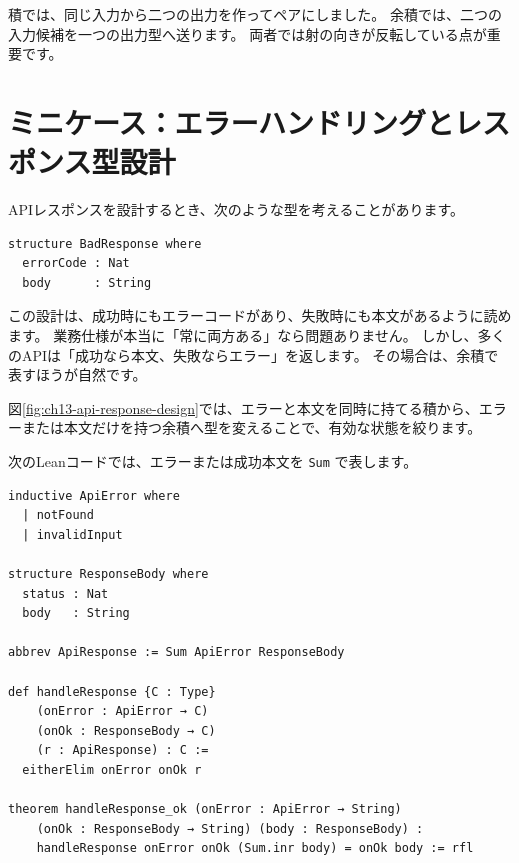 積では、同じ入力から二つの出力を作ってペアにしました。
余積では、二つの入力候補を一つの出力型へ送ります。
両者では射の向きが反転している点が重要です。

\section{ミニケース：エラーハンドリングとレスポンス型設計}
\label{sec:ch13-api-response}

APIレスポンスを設計するとき、次のような型を考えることがあります。

\begin{listing}[htbp]
\begin{verbatim}
structure BadResponse where
  errorCode : Nat
  body      : String
\end{verbatim}
\caption{\texttt{BadResponse}}
\label{lst:ch13_bad_response}
\end{listing}

この設計は、成功時にもエラーコードがあり、失敗時にも本文があるように読めます。
業務仕様が本当に「常に両方ある」なら問題ありません。
しかし、多くのAPIは「成功なら本文、失敗ならエラー」を返します。
その場合は、余積で表すほうが自然です。

図\ref{fig:ch13-api-response-design}では、エラーと本文を同時に持てる積から、エラーまたは本文だけを持つ余積へ型を変えることで、有効な状態を絞ります。


次のLeanコードでは、エラーまたは成功本文を \texttt{Sum} で表します。

\begin{listing}[htbp]
\begin{verbatim}
inductive ApiError where
  | notFound
  | invalidInput

structure ResponseBody where
  status : Nat
  body   : String

abbrev ApiResponse := Sum ApiError ResponseBody

def handleResponse {C : Type}
    (onError : ApiError → C)
    (onOk : ResponseBody → C)
    (r : ApiResponse) : C :=
  eitherElim onError onOk r

theorem handleResponse_ok (onError : ApiError → String)
    (onOk : ResponseBody → String) (body : ResponseBody) :
    handleResponse onError onOk (Sum.inr body) = onOk body := rfl
\end{verbatim}
\caption{\texttt{ApiResponse} と \texttt{handleResponse}}
\label{lst:ch13_api_response}
\end{listing}

